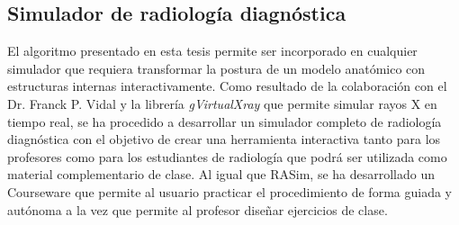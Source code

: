 \subsection{Simulador de radiología diagnóstica}
El algoritmo presentado en esta tesis permite ser incorporado en cualquier simulador que requiera transformar la postura de un modelo anatómico con estructuras internas interactivamente.
Como resultado de la colaboración con el Dr. Franck P. Vidal y la librería \emph{gVirtualXray}\cite{sujar:hal} que permite simular rayos X en tiempo real, se ha procedido a desarrollar un simulador completo de radiología diagnóstica con el objetivo de crear una herramienta interactiva tanto para los profesores como para los estudiantes de radiología que podrá ser utilizada como material complementario de clase.
Al igual que \ac{RASim}, se ha desarrollado un \ac{Courseware} que permite al usuario practicar el procedimiento de forma guiada y autónoma a la vez que permite al profesor diseñar ejercicios de clase. 


